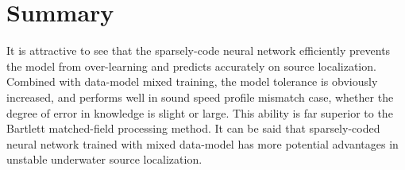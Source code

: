 \section{Summary}
It is attractive to see that the sparsely-code neural network efficiently prevents the model from over-learning and predicts accurately on source localization.
Combined with data-model mixed training, the model tolerance is obviously increased, and performs well in sound speed profile mismatch case, whether
the degree of error in knowledge is slight or large.
This ability is far superior to the Bartlett matched-field processing method.
It can be said that sparsely-coded neural network trained with mixed data-model has more potential advantages in unstable underwater
source localization.

